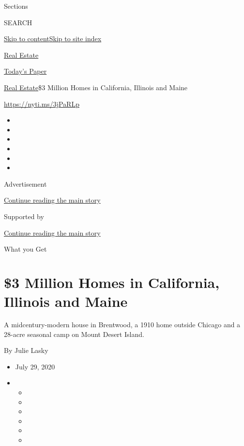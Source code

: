 Sections

SEARCH

\protect\hyperlink{site-content}{Skip to
content}\protect\hyperlink{site-index}{Skip to site index}

\href{https://www.nytimes.com/section/realestate}{Real Estate}

\href{https://myaccount.nytimes.com/auth/login?response_type=cookie\&client_id=vi}{}

\href{https://www.nytimes.com/section/todayspaper}{Today's Paper}

\href{/section/realestate}{Real Estate}\textbar{}\$3 Million Homes in
California, Illinois and Maine

\url{https://nyti.ms/3jPaRLp}

\begin{itemize}
\item
\item
\item
\item
\item
\item
\end{itemize}

Advertisement

\protect\hyperlink{after-top}{Continue reading the main story}

Supported by

\protect\hyperlink{after-sponsor}{Continue reading the main story}

What you Get

\hypertarget{3-million-homes-in-california-illinois-and-maine}{%
\section{\$3 Million Homes in California, Illinois and
Maine}\label{3-million-homes-in-california-illinois-and-maine}}

A midcentury-modern house in Brentwood, a 1910 home outside Chicago and
a 28-acre seasonal camp on Mount Desert Island.

By Julie Lasky

\begin{itemize}
\item
  July 29, 2020
\item
  \begin{itemize}
  \item
  \item
  \item
  \item
  \item
  \item
  \end{itemize}
\end{itemize}

